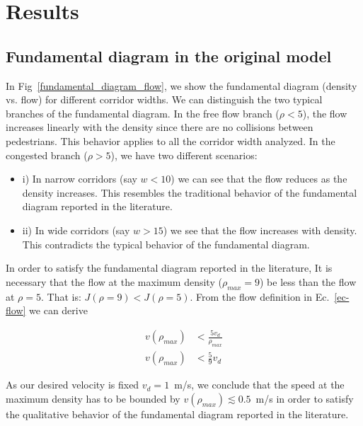 \section{\label{results}Results}

\subsection{Fundamental diagram in the original model}

In Fig~\ref{fundamental_diagram_flow}, we show the fundamental diagram (density vs. flow) for different corridor widths. We can distinguish the two typical branches of the fundamental diagram. In the free flow branch ($\rho < 5$), the flow increases linearly with the density since there are no collisions between pedestrians. This behavior applies to all the corridor width analyzed. In the congested branch ($\rho > 5$), we have two different scenarios:


\begin{itemize}
\item i) In narrow corridors (say $w < 10$) we can see that the flow reduces as the density increases. This resembles the traditional behavior of the fundamental diagram reported in the literature. 
\item ii) In wide corridors (say $w > 15$) we see that the flow increases with density. This contradicts the typical behavior of the fundamental diagram.   
\end{itemize}


In order to satisfy the fundamental diagram reported in the literature, It is necessary that the flow at the maximum density ($\rho_{max} = 9$) be less than the flow at $\rho = 5$. That is:  $J(\rho = 9) < J(\rho = 5)$. From the flow definition in Ec.~\ref{ec-flow} we can derive

\begin{align*} 
v(\rho_{max}) &< \frac{5v_d}{\rho_{max}} \\
v(\rho_{max}) &< \frac{5}{9} v_d
\end{align*}


As our desired velocity is fixed $v_d = 1$~m/s, we conclude that the speed at the maximum density has to be bounded by $v(\rho_{max}) \lesssim 	0.5$~m/s in order to satisfy the qualitative behavior of the fundamental diagram reported in the literature.

